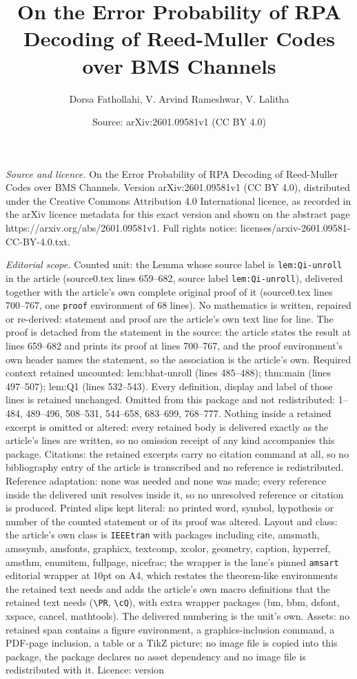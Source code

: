 \documentclass[10pt,a4paper]{amsart}
\title[On the Error Probability of RPA Decoding of Reed-Muller Code]{On the Error Probability of RPA Decoding of Reed-Muller Codes over BMS Channels}
\author{Dorsa Fathollahi, V. Arvind Rameshwar, V. Lalitha}
\date{Source: arXiv:2601.09581v1 (CC BY 4.0)}
\begin{document}
\maketitle

\noindent\emph{Source and licence.} On the Error Probability of RPA Decoding of Reed-Muller Codes over BMS Channels. Version arXiv:2601.09581v1 (CC BY 4.0), distributed under the Creative Commons Attribution 4.0 International licence, as recorded in the arXiv licence metadata for this exact version and shown on the abstract page https://arxiv.org/abs/2601.09581v1. Full rights notice: licenses/arxiv-2601.09581-CC-BY-4.0.txt.\par\smallskip

\noindent\textit{Editorial scope.} Counted unit: the Lemma whose source label is \texttt{lem:Qi-unroll} in the article (source0.tex lines 659--682, source label \texttt{lem:Qi-unroll}), delivered together with the article's own complete original proof of it (source0.tex lines 700--767, one \texttt{proof} environment of 68 lines). No mathematics is written, repaired or re-derived: statement and proof are the article's own text line for line. The proof is detached from the statement in the source: the article states the result at lines 659--682 and prints its proof at lines 700--767, and the proof environment's own header names the statement, so the association is the article's own. Required context retained uncounted: lem:bhat-unroll (lines 485--488); thm:main (lines 497--507); lem:Q1 (lines 532--543). Every definition, display and label of those lines is retained unchanged. Omitted from this package and not redistributed: 1--484, 489--496, 508--531, 544--658, 683--699, 768--777. Nothing inside a retained excerpt is omitted or altered: every retained body is delivered exactly as the article's lines are written, so no omission receipt of any kind accompanies this package. Citations: the retained excerpts carry no citation command at all, so no bibliography entry of the article is transcribed and no reference is redistributed. Reference adaptation: none was needed and none was made; every reference inside the delivered unit resolves inside it, so no unresolved reference or citation is produced. Printed slips kept literal: no printed word, symbol, hypothesis or number of the counted statement or of its proof was altered. Layout and class: the article's own class is \texttt{IEEEtran} with packages including cite, amsmath, amssymb, amsfonts, graphicx, textcomp, xcolor, geometry, caption, hyperref, amsthm, enumitem, fullpage, nicefrac; the wrapper is the lane's pinned \texttt{amsart} editorial wrapper at 10pt on A4, which restates the theorem-like environments the retained text needs and adds the article's own macro definitions that the retained text needs (\texttt{\textbackslash PR}, \texttt{\textbackslash cQ}), with extra wrapper packages (bm, bbm, dsfont, xspace, cancel, mathtools). The delivered numbering is the unit's own. Assets: no retained span contains a figure environment, a graphics-inclusion command, a PDF-page inclusion, a table or a TikZ picture; no image file is copied into this package, the package declares no asset dependency and no image file is redistributed with it. Licence: version 
\end{document}
